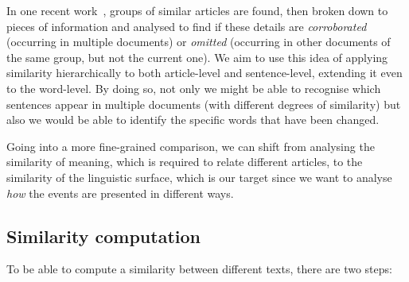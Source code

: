 


In one recent work~\cite{bountouridis2018explaining}, groups of similar articles are found, then broken down to pieces of information and analysed to find if these details are \emph{corroborated} (occurring in multiple documents) or \emph{omitted} (occurring in other documents of the same group, but not the current one). 
We aim to use this idea of applying similarity hierarchically to both article-level and sentence-level, extending it even to the word-level.
By doing so, not only we might be able to recognise which sentences appear in multiple documents (with different degrees of similarity) but also we would be able to identify the specific words that have been changed.

Going into a more fine-grained comparison, we can shift from analysing the similarity of meaning, which is required to relate different articles, to the similarity of the linguistic surface, which is our target since we want to analyse \emph{how} the events are presented in different ways.





\subsection{Similarity computation}
To be able to compute a similarity between different texts, there are two steps: %


